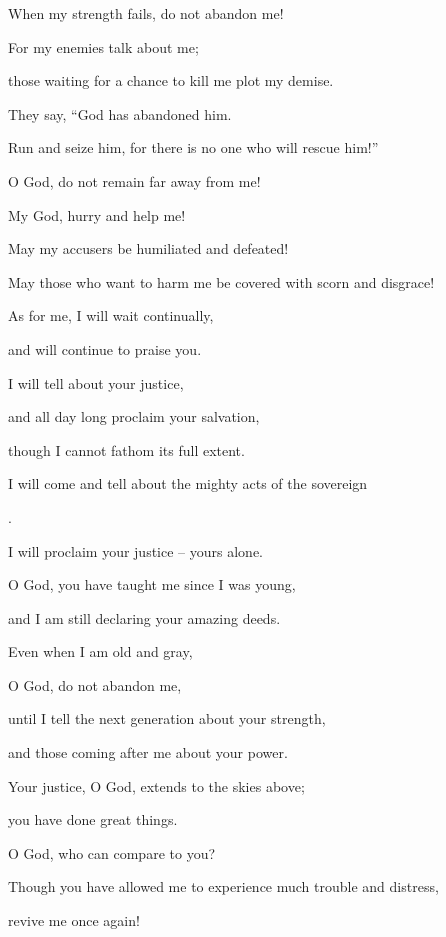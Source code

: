 {\par }{\Q When
my strength
fails,
do not
abandon me!
\par }{\Q {}For
my enemies
talk about me;
\par }{\Q those waiting
for a chance
to kill me plot my demise.
\par }{\Q {}They say, “God
has abandoned
him.
\par }{\Q Run
and seize
him, for
there is no
one who will rescue him!”
\par }{\Q {}O God,
do not
remain far
away from
me!
\par }{\Q My God,
hurry
and help me!
\par }{\Q {}May my accusers
be humiliated
and defeated!
\par }{\Q May those who want
to harm
me be covered with
scorn
and disgrace!
\par }{\Q {}As for me, I
will wait
continually,
\par }{\Q and will continue
to praise you.
\par }{\Q {}I will tell
about your justice,
\par }{\Q and all
day
long proclaim
your salvation,
\par }{\Q though
I cannot
fathom
its full extent.
\par }{\Q {}I will come
and tell about the mighty
acts of the sovereign

{}.
\par }{\Q I will proclaim
your justice
– yours alone.
\par }{\Q {}O God,
you have taught
me since I was young,
\par }{\Q and I am still declaring
your amazing deeds.
\par }{\Q {}Even
when
I am old
and gray,
\par }{\Q O God,
do not
abandon
me,
\par }{\Q until
I tell
the next generation
about your strength,
\par }{\Q and those coming
after me about your power.
\par }{\Q {}Your justice,
O God,
extends
to the skies above;
\par }{\Q you have
done
great
things.

\par }{\Q O God,
who can
compare to you?
\par }{\Q {}Though you have allowed me to experience
much
trouble
and distress,
\par }{\Q revive
me once again!

}
